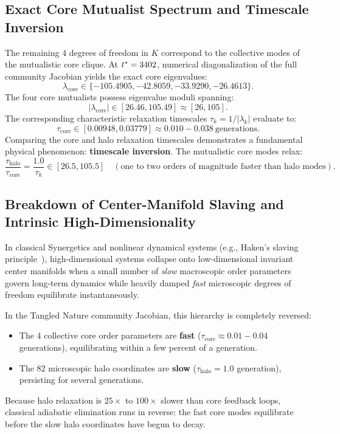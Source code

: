 \documentclass[11pt,a4paper]{article}
\begin{document}
\subsection{Exact Core Mutualist Spectrum and Timescale Inversion}
\label{sec:exact_core_spectrum}

The remaining 4 degrees of freedom in $K$ correspond to the collective modes of the mutualistic core clique. At $t^* = 3402$, numerical diagonalization of the full community Jacobian yields the exact core eigenvalues:
\begin{equation}
\lambda_{\mathrm{core}} \in \{-105.4905, -42.8059, -33.9290, -26.4613\}.
\label{eq:core_lambdas_exact}
\end{equation}
The four core mutualists possess eigenvalue moduli spanning:
\begin{equation}
|\lambda_{\mathrm{core}}| \in [26.46, 105.49] \approx [26, 105].
\end{equation}
The corresponding characteristic relaxation timescales $\tau_k = 1/|\lambda_k|$ evaluate to:
\begin{equation}
\tau_{\mathrm{core}} \in [0.00948, 0.03779] \approx 0.010 - 0.038\ \text{generations}.
\label{eq:core_tau_exact}
\end{equation}
Comparing the core and halo relaxation timescales demonstrates a fundamental physical phenomenon: \textbf{timescale inversion}. The mutualistic core modes relax:
\begin{equation}
\frac{\tau_{\mathrm{halo}}}{\tau_{\mathrm{core}}} = \frac{1.0}{\tau_k} \in [26.5, 105.5] \quad (\text{one to two orders of magnitude faster than halo modes}).
\end{equation}

\subsection{Breakdown of Center-Manifold Slaving and Intrinsic High-Dimensionality}
\label{sec:slaving_inversion}

In classical Synergetics and nonlinear dynamical systems (e.g., Haken's slaving principle~\cite{haken1983synergetics,strogatz2018nonlinear}), high-dimensional systems collapse onto low-dimensional invariant center manifolds when a small number of \emph{slow} macroscopic order parameters govern long-term dynamics while heavily damped \emph{fast} microscopic degrees of freedom equilibrate instantaneously.

In the Tangled Nature community Jacobian, this hierarchy is completely reversed:
\begin{itemize}
    \item The 4 collective core order parameters are \textbf{fast} ($\tau_{\mathrm{core}} \approx 0.01 - 0.04$ generations), equilibrating within a few percent of a generation.
    \item The 82 microscopic halo coordinates are \textbf{slow} ($\tau_{\mathrm{halo}} = 1.0$ generation), persisting for several generations.
\end{itemize}
Because halo relaxation is $25\times$ to $100\times$ slower than core feedback loops, classical adiabatic elimination runs in reverse: the fast core modes equilibrate before the slow halo coordinates have begun to decay. 
\end{document}
